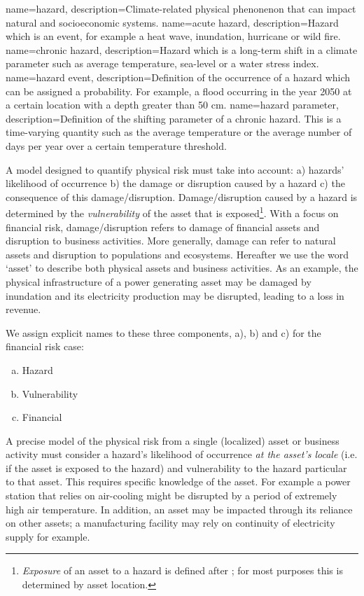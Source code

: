 \documentclass{article}
\begin{document}
{
	name=hazard,
	description=Climate-related physical phenonenon that can impact natural and socioeconomic systems.
}
{
	name=acute hazard,
	description={Hazard which is an event, for example a heat wave, inundation, hurricane or wild fire.}
}
{
	name=chronic hazard,
	description={Hazard which is a long-term shift in a climate parameter such as average temperature, sea-level or a water stress index.}  
}
{
	name=hazard event,
	description={Definition of the occurrence of a hazard which can be assigned a probability. For example, a flood occurring in the year 2050 at a certain location with a depth greater than 50 cm.}
}
{
	name=hazard parameter,
	description=Definition of the shifting parameter of a chronic hazard. This is a time-varying quantity such as the average temperature or the average number of days per year over a certain temperature threshold. 
}


A model designed to quantify physical risk must take into account: a) hazards' likelihood of occurrence  b) the damage or disruption caused by a hazard c) the consequence of this damage/disruption. Damage/disruption caused by a hazard is determined by the \emph{vulnerability} of the asset that is exposed\footnote{\emph{Exposure} of an asset to a hazard is defined after \cite{MaskreyEtAl:2011}; for most purposes this is determined by asset location.}. With a focus on financial risk, damage/disruption refers to damage of financial assets and disruption to business activities. More generally, damage can refer to natural assets and disruption to populations and ecosystems. Hereafter we use the word `asset' to describe both physical assets and business activities. As an example, the physical infrastructure of a power generating asset may be damaged by inundation and its electricity production may be disrupted, leading to a loss in revenue. 

We assign explicit names to these three components, a), b) and c) for the financial risk case:
\begin{enumerate}[a)]
\item Hazard
\item Vulnerability
\item Financial
\end{enumerate}

A precise model of the physical risk from a single (localized) asset or business activity must consider a hazard's likelihood of occurrence \emph{at the asset's locale} (i.e. if the asset is exposed to the hazard) and vulnerability to the hazard particular to that asset. This requires specific knowledge of the asset. For example a power station that relies on air-cooling might be disrupted by a period of extremely high air temperature. In addition, an asset may be impacted through its reliance on other assets; a manufacturing facility may rely on continuity of electricity supply for example.
\end{document}
